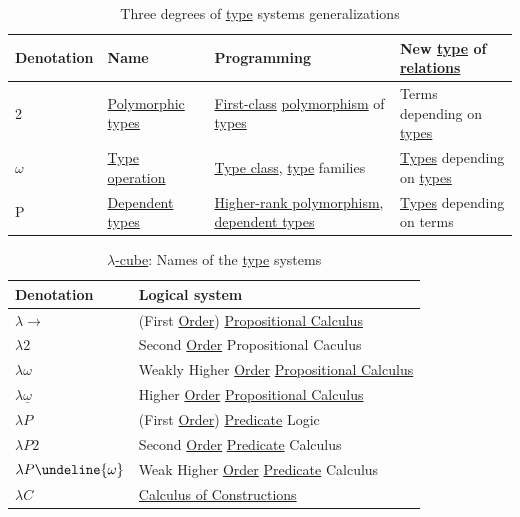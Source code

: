\documentclass[a4paper,14pt,oneside]{book}
\begin{document}
\begin{table}[htbp]
\caption{\label{tab--lambda-calculus-generalizations}Three degrees of \hyperref[org86debe5]{type} systems generalizations}
\centering
\begin{tabular}{llll}
Denotation & Name & Programming & New \hyperref[org86debe5]{type} of \hyperref[org4429112]{relations}\\
\hline
2 & \hyperref[orgede9994]{Polymorphic} \hyperref[orgb4b53b9]{types} & \hyperref[orgce8aa16]{First-class} \hyperref[orgb844b84]{polymorphism} of \hyperref[orgb4b53b9]{types} & Terms depending on \hyperref[orgb4b53b9]{types}\\
\(\omega\) & \hyperref[org86debe5]{Type} \hyperref[org2201dac]{operation} & \hyperref[org13bf178]{Type class}, \hyperref[org86debe5]{type} families & \hyperref[orgb4b53b9]{Types} depending on \hyperref[orgb4b53b9]{types}\\
P & \hyperref[org3cc9d85]{Dependent types} & \hyperref[orgdebc72c]{Higher-rank polymorphism}, \hyperref[org3cc9d85]{dependent types} & \hyperref[orgb4b53b9]{Types} depending on terms\\
\end{tabular}
\end{table}

\begin{table}[htbp]
\caption{\label{tab--lambda-calculus-names}\hyperref[orgcb2be70]{\(\lambda\)-cube}: Names of the \hyperref[org86debe5]{type} systems}
\centering
\begin{tabular}{ll}
Denotation & Logical system\\
\hline
\(\lambda\to\) & (First \hyperref[orgd7037fb]{Order}) \hyperref[org5f9d13c]{Propositional Calculus}\\
\(\lambda2\) & Second \hyperref[orgd7037fb]{Order} Propositional Caculus\\
\(\lambda\omega\) & Weakly Higher \hyperref[orgd7037fb]{Order} \hyperref[org5f9d13c]{Propositional Calculus}\\
\(\lambda \underline{\omega}\) & Higher \hyperref[orgd7037fb]{Order} \hyperref[org5f9d13c]{Propositional Calculus}\\
\(\lambda P\) & (First \hyperref[orgd7037fb]{Order}) \hyperref[org24dc504]{Predicate} Logic\\
\(\lambda P 2\) & Second \hyperref[orgd7037fb]{Order} \hyperref[org24dc504]{Predicate} Calculus\\
\(\lambda P \undeline{\omega}\) & Weak Higher \hyperref[orgd7037fb]{Order} \hyperref[org24dc504]{Predicate} Calculus\\
\(\lambda C\) & \hyperref[orgfbf439a]{Calculus of Constructions}\\
\end{tabular}
\end{table}
\end{document}

